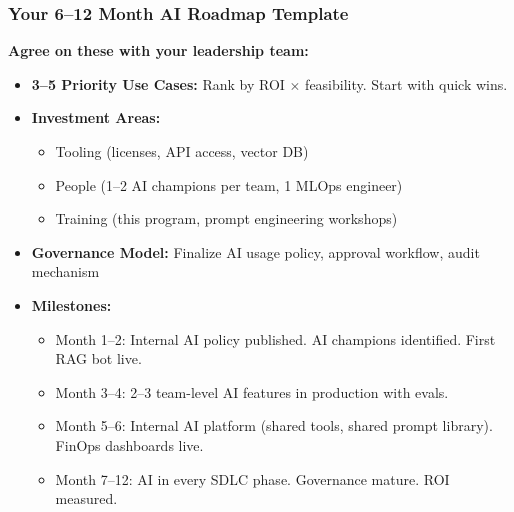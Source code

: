 \begin{frame}[fragile]\frametitle{Your 6--12 Month AI Roadmap Template}
\textbf{Agree on these with your leadership team:}
\begin{itemize}
\item \textbf{3--5 Priority Use Cases:} Rank by ROI $\times$ feasibility. Start with quick wins.
\item \textbf{Investment Areas:}
  \begin{itemize}
  \item Tooling (licenses, API access, vector DB)
  \item People (1--2 AI champions per team, 1 MLOps engineer)
  \item Training (this program, prompt engineering workshops)
  \end{itemize}
\item \textbf{Governance Model:} Finalize AI usage policy, approval workflow, audit mechanism
\item \textbf{Milestones:}
  \begin{itemize}
  \item Month 1--2: Internal AI policy published. AI champions identified. First RAG bot live.
  \item Month 3--4: 2--3 team-level AI features in production with evals.
  \item Month 5--6: Internal AI platform (shared tools, shared prompt library). FinOps dashboards live.
  \item Month 7--12: AI in every SDLC phase. Governance mature. ROI measured.
  \end{itemize}
\end{itemize}
\end{frame}

